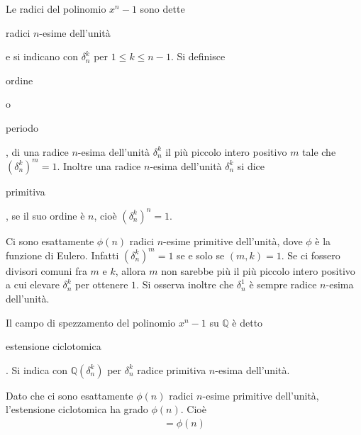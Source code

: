 \begin{definizione}
Le radici del polinomio $x^n - 1$ sono dette \begin{bfseries}radici $n$-esime dell'unità\end{bfseries} e si indicano con $\delta_{n}^{k}$ per $1\leq k \leq n-1$. Si definisce \begin{bfseries}ordine\end{bfseries} o \begin{bfseries}periodo\end{bfseries}, di una radice $n$-esima dell'unità $\delta_{n}^{k}$ il più piccolo intero positivo $m$ tale che $(\delta_{n}^{k})^m = 1$. Inoltre una radice $n$-esima dell'unità $\delta_{n}^{k}$ si dice \begin{bfseries}primitiva\end{bfseries}, se il suo ordine è $n$, cioè $(\delta_{n}^{k})^n = 1$. 
\end{definizione}

\begin{osservazione}
Ci sono esattamente $\phi(n)$ radici $n$-esime primitive dell'unità, dove $\phi$ è la funzione di Eulero. Infatti $(\delta_{n}^{k})^m = 1$ se e solo se $(m,k) = 1$. Se ci fossero divisori comuni fra $m$ e $k$, allora $m$ non sarebbe più il più piccolo intero positivo a cui elevare $\delta_{n}^{k}$ per ottenere $1$. Si osserva inoltre che $\delta_{n}^{1}$ è sempre radice $n$-esima dell'unità.
\end{osservazione}

\begin{definizione} 
Il campo di spezzamento del polinomio $x^n - 1$ su $\mathbb{Q}$ è detto \begin{bfseries}estensione ciclotomica\end{bfseries}. Si indica con $\mathbb{Q}(\delta_{n}^{k})$ per $\delta_{n}^{k}$ radice primitiva $n$-esima dell'unità.
\end{definizione}

\begin{osservazione} \label{osservazionedue}
Dato che ci sono esattamente $\phi(n)$ radici $n$-esime primitive dell'unità, l'estensione ciclotomica  ha grado $\phi(n)$. Cioè
\begin{align*} 
[\mathbb{Q}(\delta_{n}^{k}): \mathbb{Q}] = \phi(n)
\end{align*}
\end{osservazione}

